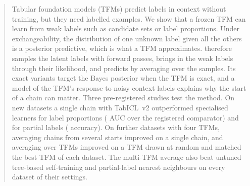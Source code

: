 \begin{abstract}
Tabular foundation models (TFMs) predict labels in context without training, but they need labelled examples. We show
that a frozen TFM can learn from weak labels such as candidate sets or label proportions. Under
exchangeability, the distribution of one unknown label given all the others is a posterior predictive, which is what a
TFM approximates. \ours{} therefore samples the latent labels with forward passes, brings in the weak labels
through their likelihood, and predicts by averaging over the samples. Its exact variants target the Bayes posterior
when the TFM is exact, and a model of the TFM's response to noisy context labels explains why the start of a chain can
matter. Three pre-registered studies test the method. On  new datasets a single chain with TabICL~v2
outperformed specialised learners for label proportions ( AUC over the registered comparator)
and for partial labels ( accuracy). On  further datasets with four TFMs, averaging
chains from several starts improved on a single chain, and averaging over TFMs improved on a TFM drawn at random and
matched the best TFM of each dataset. The multi-TFM average also beat untuned tree-based self-training and
partial-label nearest neighbours on every dataset of their settings.
\end{abstract}
